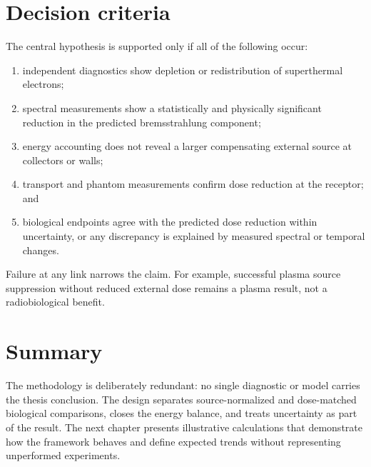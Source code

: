 \section{Decision criteria}

The central hypothesis is supported only if all of the following occur:
\begin{enumerate}
\item independent diagnostics show depletion or redistribution of superthermal electrons;
\item spectral measurements show a statistically and physically significant reduction in the predicted bremsstrahlung component;
\item energy accounting does not reveal a larger compensating external source at collectors or walls;
\item transport and phantom measurements confirm dose reduction at the receptor; and
\item biological endpoints agree with the predicted dose reduction within uncertainty, or any discrepancy is explained by measured spectral or temporal changes.
\end{enumerate}
Failure at any link narrows the claim. For example, successful plasma source suppression without reduced external dose remains a plasma result, not a radiobiological benefit.

\section{Summary}

The methodology is deliberately redundant: no single diagnostic or model carries the thesis conclusion. The design separates source-normalized and dose-matched biological comparisons, closes the energy balance, and treats uncertainty as part of the result. The next chapter presents illustrative calculations that demonstrate how the framework behaves and define expected trends without representing unperformed experiments.
